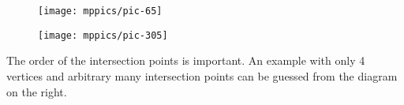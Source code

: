 \documentclass{article}
\begin{document}
\begin{figure}[!ht]
\begin{minipage}{.48\textwidth}
\centering
\texttt{[image: mppics/pic-65]}
\end{minipage}\hfill
\begin{minipage}{.48\textwidth}
\centering
\texttt{[image: mppics/pic-305]}
\end{minipage}
\end{figure}

The order of the intersection points is important. 
An example with only 4 vertices and arbitrary many intersection points can be guessed from the diagram on the right. 



\sloppy
\printbibliography[heading=bibintoc]
\fussy
\end{document}
